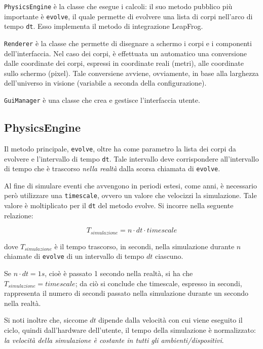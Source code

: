 \documentclass{article}
\begin{document}
\verb|PhysicsEngine| è la classe che esegue i calcoli: il suo metodo pubblico più importante è \verb|evolve|, il quale permette di evolvere una lista di corpi nell'arco di tempo \verb|dt|. Esso implementa il metodo di integrazione LeapFrog.

\verb|Renderer| è la classe che permette di disegnare a schermo i corpi e i componenti dell'interfaccia. Nel caso dei corpi, è effettuata un automatico una conversione dalle coordinate dei corpi, espressi in coordinate reali (metri), alle coordinate sullo schermo (pixel). Tale conversiene avviene, ovviamente, in base alla larghezza dell'universo in visione (variabile a seconda della configurazione).

\verb|GuiManager| è una classe che crea e gestisce l'interfaccia utente.

\subsection{PhysicsEngine}
Il metodo principale, \verb|evolve|, oltre ha come parametro la lista dei corpi da evolvere e l'intervallo di tempo \verb|dt|. Tale intervallo deve corrispondere all'intervallo di tempo che è trascorso \textit{nella realtà} dalla scorsa chiamata di \verb|evolve|.

Al fine di simulare eventi che avvengono in periodi estesi, come anni, è necessario però utilizzare una \verb|timescale|, ovvero un valore che velocizzi la simulazione. Tale valore è moltiplicato per il \verb|dt| del metodo evolve. Si incorre nella seguente relazione:

\begin{equation*}
    T_{simulazione} = n \cdot dt \cdot timescale
\end{equation*}

dove $T_{simulazione}$ è il tempo trascorso, in secondi, nella simulazione durante $n$ chiamate di \verb|evolve| di un intervallo di tempo $dt$ ciascuno.

 Se $n \cdot dt = 1 s$, cioè è passato 1 secondo nella realtà, si ha che $T_{simulazione} = timescale$; da ciò si conclude che timescale, espresso in secondi, rappresenta il numero di secondi passato nella simulazione durante un secondo nella realtà.

Si noti inoltre che, siccome $dt$ dipende dalla velocità con cui viene eseguito il ciclo, quindi dall'hardware dell'utente, il tempo della simulazione è normalizzato: \textit{la velocità della simulazione è costante in tutti gli ambienti/dispositivi}.
\end{document}
